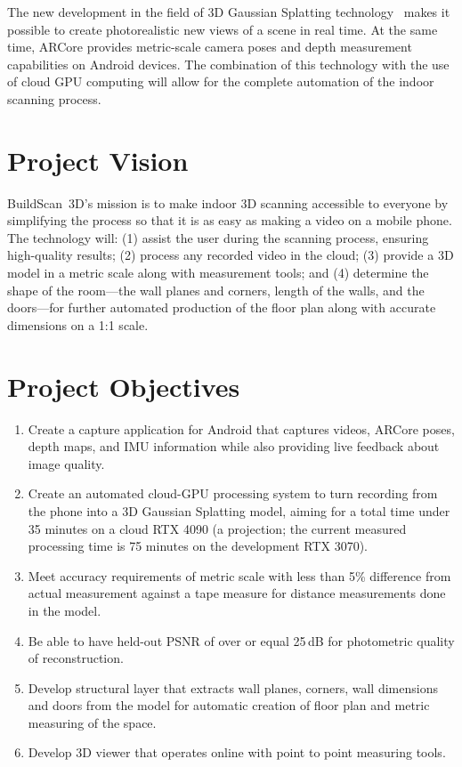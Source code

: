 The new development in the field of 3D Gaussian Splatting technology~\cite{kerbl3dgs} makes it possible to create photorealistic new views of a scene in real time. At the same time, ARCore provides metric-scale camera poses and depth measurement capabilities on Android devices. The combination of this technology with the use of cloud GPU computing will allow for the complete automation of the indoor scanning process.

\section{Project Vision}
BuildScan~3D's mission is to make indoor 3D scanning accessible to everyone by simplifying the process so that it is as easy as making a video on a mobile phone. The technology will: (1) assist the user during the scanning process, ensuring high-quality results; (2) process any recorded video in the cloud; (3) provide a 3D model in a metric scale along with measurement tools; and (4) determine the shape of the room---the wall planes and corners, length of the walls, and the doors---for further automated production of the floor plan along with accurate dimensions on a 1:1 scale.

\section{Project Objectives}
\begin{enumerate}
    \item Create a capture application for Android that captures videos, ARCore poses, depth maps, and IMU information while also providing live feedback about image quality.
    \item Create an automated cloud-GPU processing system to turn recording from the phone into a 3D Gaussian Splatting model, aiming for a total time under 35 minutes on a cloud RTX 4090 (a projection; the current measured processing time is 75 minutes on the development RTX 3070).
    \item Meet accuracy requirements of metric scale with less than 5\% difference from actual measurement against a tape measure for distance measurements done in the model.
    \item Be able to have held-out PSNR of over or equal 25\,dB for photometric quality of reconstruction.
    \item Develop structural layer that extracts wall planes, corners, wall dimensions and doors from the model for automatic creation of floor plan and metric measuring of the space.
    \item Develop 3D viewer that operates online with point to point measuring tools.
\end{enumerate}

